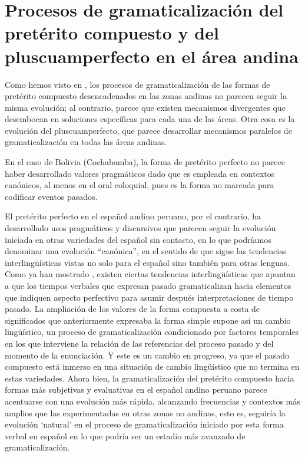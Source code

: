 \documentclass[output=paper]{../langscibook}
\begin{document}
\section{Procesos de gramaticalización del pretérito compuesto y del pluscuamperfecto en el área andina}\label{sec:palacios:5}

Como hemos visto en , los procesos de gramaticalización de las formas de pretérito compuesto desencadenados en las zonas andinas no parecen seguir la misma evolución; al contrario, parece que existen mecanismos divergentes que desembocan en soluciones específicas para cada una de las áreas. Otra cosa es la evolución del pluscuamperfecto, que parece desarrollar mecanismos paralelos de gramaticalización en todas las áreas andinas.

En el caso de Bolivia (Cochabamba), la forma de pretérito perfecto no parece haber desarrollado valores pragmáticos dado que es empleada en contextos canónicos, al menos en el oral coloquial, pues es la forma no marcada para codificar eventos pasados.

El pretérito perfecto en el español andino peruano, por el contrario, ha desarrollado usos pragmáticos y discursivos que parecen seguir la evolución iniciada en otras variedades del español sin contacto, en lo que podríamos denominar una evolución “canónica”, en el sentido de que sigue las tendencias interlingüísticas vistas no solo para el español sino también para otras lenguas. Como ya han mostrado   \citet{BybeeEtAl1994}, existen ciertas tendencias interlingüísticas que apuntan a que los tiempos verbales que expresan pasado gramaticalizan hacia elementos que indiquen aspecto perfectivo para asumir después interpretaciones de tiempo pasado. La ampliación de los valores de la forma compuesta a costa de significados que anteriormente expresaba la forma simple supone así un cambio lingüístico, un proceso de gramaticalización condicionado por factores temporales en los que interviene la relación de las referencias del proceso pasado y del momento de la enunciación. Y este es un cambio en progreso, ya que el pasado compuesto está inmerso en una situación de cambio lingüístico que no termina en estas variedades. Ahora bien, la gramaticalización del pretérito compuesto hacia formas más subjetivas y evaluativas en el español andino peruano parece acentuarse con una evolución más rápida, alcanzando frecuencias y contextos más amplios que las experimentadas en otras zonas no andinas, esto es, seguiría la evolución ‘natural’ en el proceso de gramaticalización iniciado por esta forma verbal en español en lo que podría ser un estadio más avanzado de gramaticalización.
\end{document}
